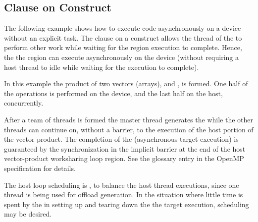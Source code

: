 \subsection{ Clause on  Construct}
\label{subsec:target_nowait_clause}

The following example shows how to execute code asynchronously on a 
device without an explicit task. The  clause on a  
construct allows the thread of the  to perform other
work while waiting for the  region execution to complete. 
Hence, the the  region can execute asynchronously on the 
device (without requiring a host thread to idle while waiting for 
the  execution to complete).

In this example the product of two vectors (arrays), 
and , is formed. One half of the operations is performed
on the device, and the last half on the host, concurrently.

After a team of threads is formed the master thread generates 
the  while the other threads can continue on, without a barrier,
to the execution of the host portion of the vector product.
The completion of the  (asynchronous target execution) is 
guaranteed by the synchronization in the implicit barrier at the end of the 
host vector-product worksharing loop region. See the  
glossary entry in the OpenMP specification for details.

The host loop scheduling is , to balance the host thread executions, since 
one thread is being used for offload generation. In the situation where 
little time is spent by the  in setting 
up and tearing down the the target execution,  scheduling may be desired. 


